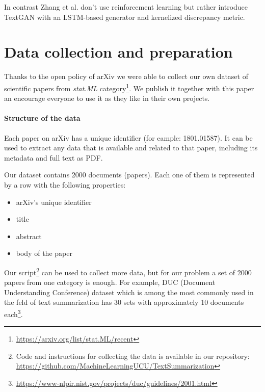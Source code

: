 \documentclass[sigplan]{acmart}
\begin{document}
In contrast Zhang et al.\cite{zhang-17} don't use reinforcement learning but rather introduce TextGAN with an LSTM-based generator and kernelized discrepancy metric.



\section{Data collection and preparation}

Thanks to the open policy of arXiv we were able to collect our own dataset of scientific papers from \textit{stat.ML} category\footnote{\url{https://arxiv.org/list/stat.ML/recent}}. We publish it together with this paper an encourage everyone to use it as they like in their own projects.

\paragraph{Structure of the data} Each paper on arXiv has a unique identifier (for eample: 1801.01587). It can be used to extract any data that is available and related to that paper, including its metadata and full text as PDF.

Our dataset contains 2000 documents (papers). Each one of them is represented by a row with the following properties:

\begin{itemize}
  \item arXiv's unique identifier
  \item title
  \item abstract
  \item body of the paper
\end{itemize}

Our script\footnote{Code and instructions for collecting the data is available in our repository: \url{https://github.com/MachineLearningUCU/TextSummarization}} can be used to collect more data, but for our problem a set of 2000 papers from one category is enough. For example, DUC (Document Understanding Conference) dataset which is among the most commonly used in the feld of text summarization has 30 sets with approximately 10 documents each\footnote{\url{https://www-nlpir.nist.gov/projects/duc/guidelines/2001.html}}.
\end{document}
